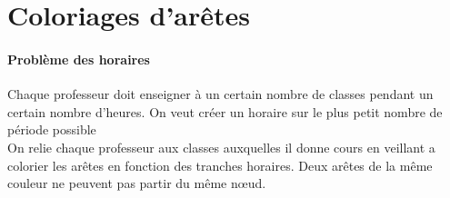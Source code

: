 \section{Coloriages d'arêtes}

\paragraph{Problème des horaires}
Chaque professeur doit enseigner à un certain nombre de classes pendant un certain nombre d'heures. On veut créer
un horaire sur le plus petit nombre de période possible
\\On relie chaque professeur aux classes auxquelles il donne cours en veillant a colorier les arêtes en fonction des tranches horaires. Deux arêtes de la même couleur ne peuvent pas partir du même nœud. 



